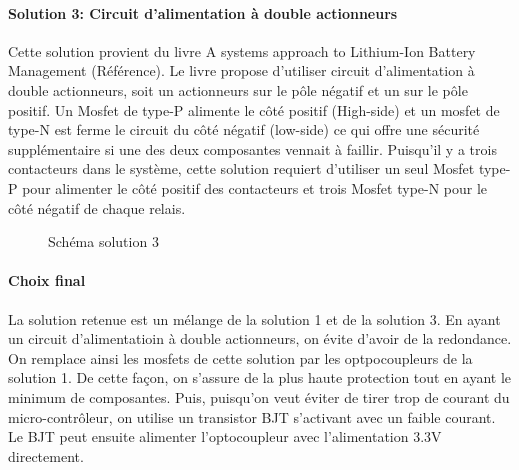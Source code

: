 		\paragraph*{Solution 3: Circuit d'alimentation à double actionneurs}
		Cette solution provient du livre A systems approach to Lithium-Ion Battery Management (Référence). Le livre propose d'utiliser circuit d'alimentation à double actionneurs, soit un actionneurs sur le pôle négatif et un sur le pôle positif. Un Mosfet de type-P alimente le côté positif (High-side) et un mosfet de type-N est ferme le circuit du côté négatif (low-side) ce qui offre une sécurité supplémentaire si une des deux composantes vennait à faillir. Puisqu'il y a trois contacteurs dans le système, cette solution requiert d'utiliser un seul Mosfet type-P pour alimenter le côté positif des contacteurs et trois Mosfet type-N pour le côté négatif de chaque relais.

		\begin{figure}[H]
			\centering
			\caption[Solution 3]{Schéma solution 3}
			\label{fig:contactorsol3}
		\end{figure}

		
		\paragraph*{Choix final}
		La solution retenue est un mélange de la solution 1 et de la solution 3. En ayant un circuit d'alimentatioin à double actionneurs, on évite d'avoir de la redondance. On remplace ainsi les mosfets de cette solution par les optpocoupleurs de la solution 1. De cette façon, on s'assure de la plus haute protection tout en ayant le minimum de composantes. Puis, puisqu'on veut éviter de tirer trop de courant du micro-contrôleur, on utilise un transistor BJT s'activant avec un faible courant. Le BJT peut ensuite alimenter l'optocoupleur avec l'alimentation 3.3V directement.

